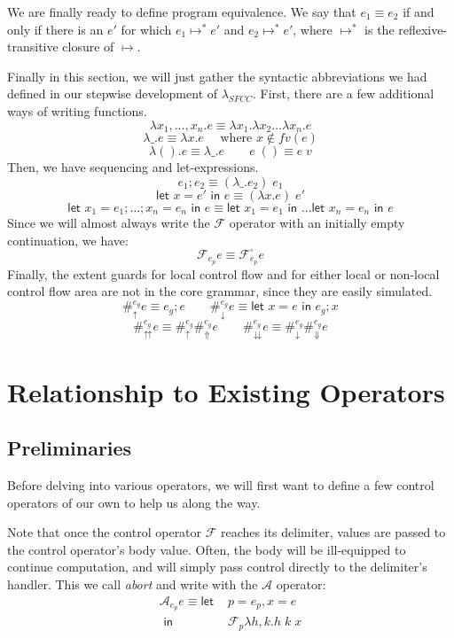 \documentclass[11pt]{article}
\newcommand{\maybePage}{\newpage}
\newcommand\x{\lambda x}
\newcommand{\letin}[2]{\textsf{let }#1\textsf{ in }#2}
\newcommand\F{\mathcal{F}}
\newcommand\A{\mathcal{A}}
\begin{document}
We are finally ready to define program equivalence.
We say that $e_1 \equiv e_2$ if and only if there is an $e'$ for which $e_1 \mapsto^* e'$ and $e_2 \mapsto^* e'$, where $\mapsto^*$ is the reflexive-transitive closure of $\mapsto$.

Finally in this section, we will just gather the syntactic abbreviations we had defined in our stepwise development of $\lambda_{SFCC}$.
First, there are a few additional ways of writing functions.
$$\x_1,\ldots,x_n.e \equiv \x_1.\x_2\ldots\x_n.e$$
$$\lambda\_.e \equiv \x.e \quad\textrm{ where }x \notin fv(e)$$
$$\lambda().e \equiv \lambda\_.e \qquad
  e\;() \equiv e\;v$$
Then, we have sequencing and let-expressions.
$$e_1; e_2 \equiv (\lambda\_.e_2)\;e_1$$
$$\letin{x = e'}{e} \equiv (\x.e)\;e'$$
$$\letin{x_1 = e_1; \ldots; x_n = e_n}{e} \equiv \letin{x_1 = e_1}{\ldots\letin{x_n = e_n}{e}}$$
Since we will almost always write the $\F$ operator with an initially empty continuation, we have:
$$\F_{e_p}e \equiv \F_{e_p}^{\square}e$$
Finally, the extent guards for local control flow and for either local or non-local control flow area are not in the core grammar, since they are easily simulated.
$$\#_\uparrow^{e_g}e \equiv e_g; e \qquad
  \#_\downarrow^{e_g}e \equiv \letin{x=e}{e_g; x}$$
$$\#_\upuparrows^{e_g}e \equiv \#_\uparrow^{e_g}\#_\Uparrow^{e_g}e \qquad
  \#_\downdownarrows^{e_g}e \equiv \#_\downarrow^{e_g}\#_\Downarrow^{e_g}e$$





\maybePage
\section{Relationship to Existing Operators}

\subsection{Preliminaries}
Before delving into various operators, we will first want to define a few control operators of our own to help us along the way.

Note that once the control operator $\F$ reaches its delimiter, values are passed to the control operator's body value.
Often, the body will be ill-equipped to continue computation, and will simply pass control directly to the delimiter's handler.
This we call \emph{abort} and write with the $\A$ operator:
\begin{align*}
\A_{e_p}e \equiv \letin{&p = e_p, x = e\\}%
                       {&\F_{p}\lambda h,k. h\;k\;x}
\end{align*}
\end{document}
